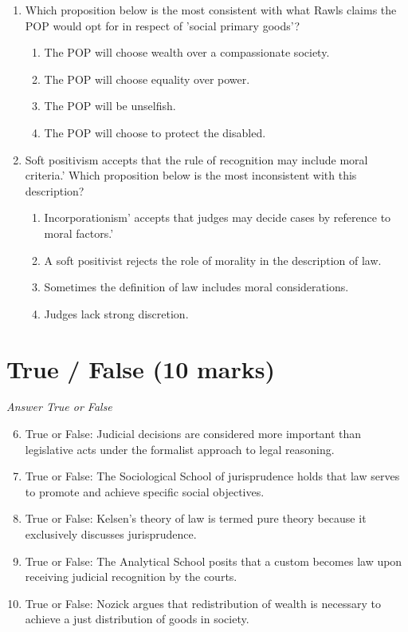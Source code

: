 \documentclass[12pt]{article}
\begin{document}
\begin{enumerate}[label=\arabic*.]
\begin{enumerate}[label=(\alph*)]
\end{enumerate}
\item Which proposition below is the most consistent with what Rawls claims the POP would opt for in respect of 'social primary goods'?
\begin{enumerate}[label=(\alph*)]
    \item The POP will choose wealth over a compassionate society.
    \item The POP will choose equality over power.
    \item The POP will be unselfish.
    \item The POP will choose to protect the disabled.
\end{enumerate}
\item Soft positivism accepts that the rule of recognition may include moral criteria.' Which proposition below is the most inconsistent with this description?
\begin{enumerate}[label=(\alph*)]
    \item Incorporationism' accepts that judges may decide cases by reference to moral factors.'
    \item A soft positivist rejects the role of morality in the description of law.
    \item Sometimes the definition of law includes moral considerations.
    \item Judges lack strong discretion.
\end{enumerate}
\end{enumerate}

\section*{True / False (10 marks)}
\textit{Answer True or False}
\begin{enumerate}[label=\arabic*.]
\setcounter{enumi}{5}
\item True or False: Judicial decisions are considered more important than legislative acts under the formalist approach to legal reasoning.
\item True or False: The Sociological School of jurisprudence holds that law serves to promote and achieve specific social objectives.
\item True or False: Kelsen's theory of law is termed pure theory because it exclusively discusses jurisprudence.
\item True or False: The Analytical School posits that a custom becomes law upon receiving judicial recognition by the courts.
\item True or False: Nozick argues that redistribution of wealth is necessary to achieve a just distribution of goods in society.
\end{enumerate}
\end{document}

